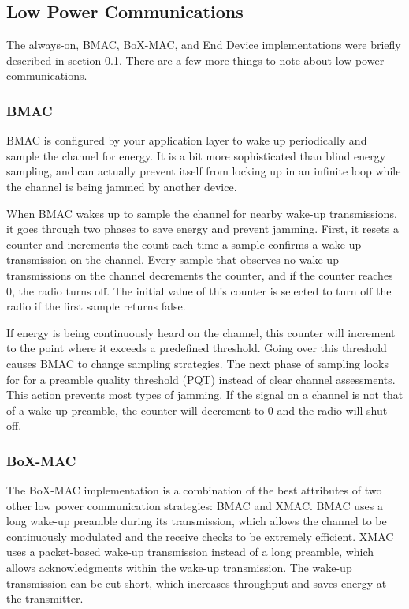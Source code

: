 \documentclass{article}
\begin{document}
\subsection{Low Power Communications}
\label{sec:lpl}
The always-on, BMAC, BoX-MAC, and End Device implementations were briefly 
described in section \ref{sec:lpl}.  There are a few more things
to note about low power communications.  

\subsubsection{BMAC}
\label{sec:bmac}
BMAC \cite{bmac} is configured by
your application layer to wake up periodically and sample the channel
for energy.  It is a bit more sophisticated than blind energy sampling, 
and can actually prevent itself from locking up in an infinite loop
while the channel is being jammed by another device.

When BMAC wakes up to sample the channel for nearby wake-up transmissions,
it goes through two phases to save energy and prevent jamming. First,
it resets a counter and increments the count each time a sample confirms a
wake-up transmission on the channel. Every sample that observes no wake-up 
transmissions on the channel decrements the counter, and if the counter reaches
0, the radio turns off.  The initial value of this counter is selected to 
turn off the radio if the first sample returns false.

If energy is being continuously heard on the channel, this counter will increment
to the point where it exceeds a predefined threshold. Going over this threshold
causes BMAC to change sampling strategies.  The next phase of sampling looks for
for a preamble quality threshold (PQT) instead of clear channel assessments.
This action prevents most types of jamming. If the signal on a channel is not
that of a wake-up preamble, the counter will decrement to 0 and the radio will
shut off.

\subsubsection{BoX-MAC}
\label{sec:boxmac}
The BoX-MAC \cite{boxmac} implementation is a combination of the best attributes of two other
low power communication strategies:  BMAC and XMAC.  BMAC uses a long wake-up 
preamble during its transmission, which allows the channel to be continuously 
modulated and the receive checks to be extremely efficient.  XMAC uses a packet-based
wake-up transmission instead of a long preamble, which allows acknowledgments within
the wake-up transmission. The wake-up transmission can be cut short, which increases 
throughput and saves energy at the transmitter. 
\end{document}
